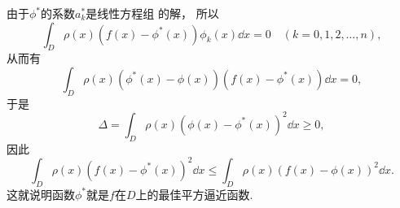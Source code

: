 由于\(\phi^*\)的系数\(a^*_k\)是线性方程组  的解，
所以\begin{equation*}
	\int_D \rho(x) (f(x) - \phi^*(x)) \phi_k(x) \dd{x} = 0
	\quad(k=0,1,2,\dotsc,n),
\end{equation*}
从而有\begin{equation*}
	\int_D \rho(x) (\phi^*(x) - \phi(x)) (f(x) - \phi^*(x)) \dd{x} = 0,
\end{equation*}
于是\begin{equation*}
	\Delta
	= \int_D \rho(x) (\phi(x) - \phi^*(x))^2 \dd{x}
	\geq 0,
\end{equation*}
因此\begin{equation*}
	\int_D \rho(x) (f(x) - \phi^*(x))^2 \dd{x}
	\leq \int_D \rho(x) (f(x) - \phi(x))^2 \dd{x}.
\end{equation*}
这就说明函数\(\phi^*\)就是\(f\)在\(D\)上的最佳平方逼近函数.
